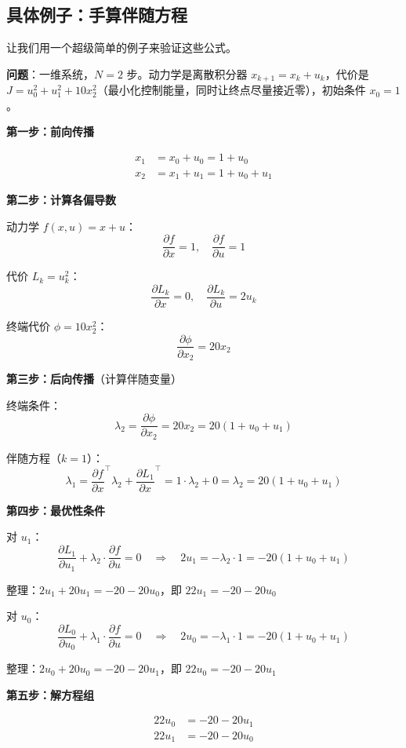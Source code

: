 \subsection{具体例子：手算伴随方程}

让我们用一个超级简单的例子来验证这些公式。

\textbf{问题}：一维系统，$N = 2$ 步。动力学是离散积分器 $x_{k+1} = x_k + u_k$，代价是 $J = u_0^2 + u_1^2 + 10 x_2^2$（最小化控制能量，同时让终点尽量接近零），初始条件 $x_0 = 1$。


\textbf{第一步：前向传播}

\begin{align}
x_1 &= x_0 + u_0 = 1 + u_0 \\
x_2 &= x_1 + u_1 = 1 + u_0 + u_1
\end{align}

\textbf{第二步：计算各偏导数}

动力学 $f(x, u) = x + u$：
\[
\frac{\partial f}{\partial x} = 1, \quad \frac{\partial f}{\partial u} = 1
\]

代价 $L_k = u_k^2$：
\[
\frac{\partial L_k}{\partial x} = 0, \quad \frac{\partial L_k}{\partial u} = 2u_k
\]

终端代价 $\phi = 10 x_2^2$：
\[
\frac{\partial \phi}{\partial x_2} = 20 x_2
\]

\textbf{第三步：后向传播}（计算伴随变量）

终端条件：
\[
\lambda_2 = \frac{\partial \phi}{\partial x_2} = 20 x_2 = 20(1 + u_0 + u_1)
\]

伴随方程（$k = 1$）：
\[
\lambda_1 = \frac{\partial f}{\partial x}^\top \lambda_2 + \frac{\partial L_1}{\partial x}^\top = 1 \cdot \lambda_2 + 0 = \lambda_2 = 20(1 + u_0 + u_1)
\]

\textbf{第四步：最优性条件}

对 $u_1$：
\[
\frac{\partial L_1}{\partial u_1} + \lambda_2 \cdot \frac{\partial f}{\partial u} = 0 \quad \Rightarrow \quad 2u_1 = -\lambda_2 \cdot 1 = -20(1 + u_0 + u_1)
\]

整理：$2u_1 + 20u_1 = -20 - 20u_0$，即 $22u_1 = -20 - 20u_0$

对 $u_0$：
\[
\frac{\partial L_0}{\partial u_0} + \lambda_1 \cdot \frac{\partial f}{\partial u} = 0 \quad \Rightarrow \quad 2u_0 = -\lambda_1 \cdot 1 = -20(1 + u_0 + u_1)
\]

整理：$2u_0 + 20u_0 = -20 - 20u_1$，即 $22u_0 = -20 - 20u_1$

\textbf{第五步：解方程组}

\begin{align}
22u_0 &= -20 - 20u_1 \\
22u_1 &= -20 - 20u_0
\end{align}

